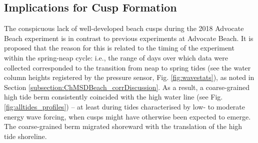 %
%
%


\subsection{Implications for Cusp Formation}

The conspicuous lack of well-developed beach cusps during the 2018 Advocate Beach experiment is in contrast to previous experiments at Advocate Beach. It is proposed that the reason for this is related to the timing of the experiment within the spring-neap cycle: i.e., the range of days over which data were collected corresponded to the transition from neap to spring tides (see the water column heights registered by the pressure sensor, Fig. \ref{fig:wavestats}), as noted in Section \ref{subsection:ChMSDBeach_corrDiscussion}. As a result, a coarse-grained high tide berm consistently coincided with the high water line (see Fig. \ref{fig:alltides_profiles}) -- at least during tides characterised by low- to moderate energy wave forcing, when cusps might have otherwise been expected to emerge. The coarse-grained berm migrated shoreward with the translation of the high tide shoreline.

